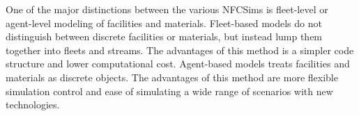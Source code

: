 \begin{table}[]
    \centering
    \caption{Nuclear Fuel Cycle Simulator Tools and their corresponding organizations.}
    \label{tab:nfctools}
    \end{table}

One of the major distinctions between the various \glspl{NFCSim}
is fleet-level or agent-level modeling of facilities and materials. 
Fleet-based models do not distinguish between discrete facilities 
or materials, but instead lump them together into fleets and streams. 
The advantages of this method is a simpler code structure and 
lower computational cost. 
Agent-based models treats facilities and materials as discrete 
objects. 
The advantages of this method are more flexible simulation control
and ease of simulating a wide range of scenarios with new 
technologies. 

